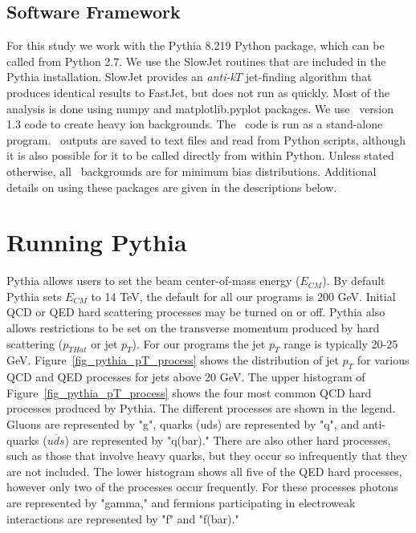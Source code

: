 \documentclass[11pt]{article}
\begin{document}
\subsection*{Software Framework}

For this study we work with the Pythia 8.219 Python package, which can be called from Python 2.7.  We use the SlowJet routines that are included in the Pythia installation.  SlowJet provides an {\it anti-k$T$} jet-finding algorithm that produces identical results to FastJet, but does not run as quickly.  Most of the analysis is done using numpy and matplotlib.pyplot packages.  We use \trento\ version 1.3 code to create heavy ion backgrounds. The \trento\ code is run as a stand-alone program.  \trento\ outputs are saved to text files and read from Python scripts, although it is also possible for it to be called directly from within Python.  Unless stated otherwise, all \trento\ backgrounds are for minimum bias distributions.  Additional details on using these packages are given in the descriptions below.

\section{Running Pythia}
%
%
Pythia allows users to set the beam center-of-mass energy ($E_{CM}$). By default Pythia sets $E_{CM}$ to 14 TeV, the default for all our programs is 200 GeV.  Initial QCD or QED hard scattering processes may be turned on or off. Pythia also allows restrictions to be set on the transverse momentum produced by hard scattering ($p_{THat}$ or jet $p_T$). For our programs the jet $p_T$ range is typically 20-25 GeV. Figure~\ref{fig_pythia_pT_process} shows the distribution of jet $p_T$ for various QCD and QED processes for jets above 20 GeV. The upper histogram of Figure~\ref{fig_pythia_pT_process} shows the four most common QCD hard processes produced by Pythia. The different processes are shown in the legend. Gluons are represented by "g", quarks (uds) are represented by "q", and anti-quarks ($\overline{uds}$) are represented by "q(bar)." There are also other hard processes, such as those that involve heavy quarks, but they occur so infrequently that they are not included. The lower histogram shows all five of the QED hard processes, however only two of the processes occur frequently. For these processes photons are represented by "gamma," and fermions participating in electroweak interactions are represented by "f" and "f(bar)."
\end{document}
